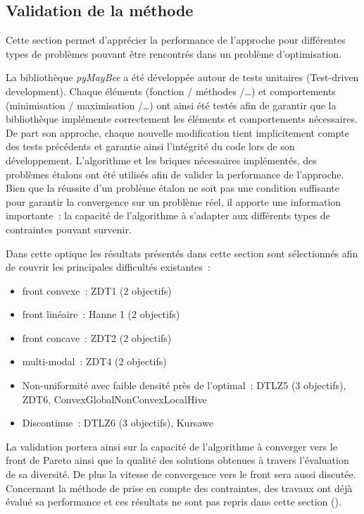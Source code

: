 



\subsection{Validation de la méthode} %
\label{sub:validation_de_la_methode}


Cette section permet d’apprécier la performance de l’approche pour différentes types
de problèmes pouvant être rencontrés dans un problème d’optimisation.

La bibliothèque \textit{pyMayBee} a été développée autour de tests unitaires
(Test-driven development).
Chaque éléments (fonction / méthodes /\dots) et comportements (minimisation / maximisation /\dots)
ont ainsi été testés afin de garantir que la bibliothèque implémente correctement
les éléments et comportements nécessaires. De part son approche, chaque nouvelle
modification tient implicitement compte des tests précédents et garantie ainsi
l’intégrité du code lors de son développement.
L’algorithme et les briques nécessaires implémentés, des problèmes étalons ont été
utilisés afin de valider la performance de l’approche. Bien que la réussite d’un
problème étalon ne soit pas une condition suffisante pour garantir la convergence
sur un problème réel, il apporte une information importante~: la capacité de
l’algorithme à s’adapter aux différents types de contraintes pouvant survenir.

Dans cette optique les résultats présentés dans cette section sont sélectionnés
afin de couvrir les principales difficultés existantes~:
\begin{itemize}
  \item front convexe~: ZDT1 (2 objectifs)
  \item front linéaire~: Hanne 1 (2 objectifs)
  \item front concave~: ZDT2 (2 objectifs)
  \item multi-modal~: ZDT4 (2 objectifs)
  \item Non-uniformité avec faible densité près de l’optimal~: DTLZ5 (3 objectifs), ZDT6, ConvexGlobalNonConvexLocalHive
  \item Discontinue~: DTLZ6 (3 objectifs), Kursawe
\end{itemize}
La validation portera ainsi sur la capacité de l’algorithme à converger vers le
front de Pareto ainsi que la qualité des solutions obtenues à travers l’évaluation
de sa diversité. De plus la vitesse de convergence vers le front sera aussi discutée.
Concernant la méthode de prise en compte des contraintes, des travaux ont déjà
évalué sa performance et ces résultats ne sont pas repris dans cette section ().

